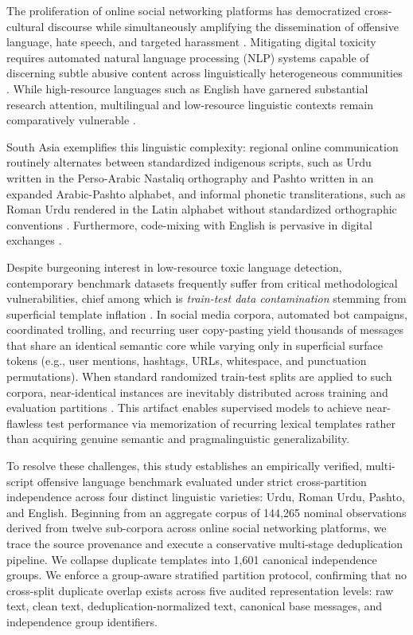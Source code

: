 \documentclass[11pt,a4paper]{article}
\begin{document}
The proliferation of online social networking platforms has democratized cross-cultural discourse while simultaneously amplifying the dissemination of offensive language, hate speech, and targeted harassment \cite{davidson2017automated,zampieri2019predicting}. Mitigating digital toxicity requires automated natural language processing (NLP) systems capable of discerning subtle abusive content across linguistically heterogeneous communities \cite{waseem2016hateful,founta2018large}. While high-resource languages such as English have garnered substantial research attention, multilingual and low-resource linguistic contexts remain comparatively vulnerable \cite{conneau2020unsupervised,rizwan2020hate}. 

South Asia exemplifies this linguistic complexity: regional online communication routinely alternates between standardized indigenous scripts, such as Urdu written in the Perso-Arabic Nastaliq orthography and Pashto written in an expanded Arabic-Pashto alphabet, and informal phonetic transliterations, such as Roman Urdu rendered in the Latin alphabet without standardized orthographic conventions \cite{shakeel2020deep,amjad2021urdu,khan2021pashto}. Furthermore, code-mixing with English is pervasive in digital exchanges \cite{akhter2020roman,bali2014borrowing}.

Despite burgeoning interest in low-resource toxic language detection, contemporary benchmark datasets frequently suffer from critical methodological vulnerabilities, chief among which is \textit{train-test data contamination} stemming from superficial template inflation \cite{elangovan2021memorization,gorman2019we}. In social media corpora, automated bot campaigns, coordinated trolling, and recurring user copy-pasting yield thousands of messages that share an identical semantic core while varying only in superficial surface tokens (e.g., user mentions, hashtags, URLs, whitespace, and punctuation permutations). When standard randomized train-test splits are applied to such corpora, near-identical instances are inevitably distributed across training and evaluation partitions \cite{arhin2021ground}. This artifact enables supervised models to achieve near-flawless test performance via memorization of recurring lexical templates rather than acquiring genuine semantic and pragmalinguistic generalizability.

To resolve these challenges, this study establishes an empirically verified, multi-script offensive language benchmark evaluated under strict cross-partition independence across four distinct linguistic varieties: Urdu, Roman Urdu, Pashto, and English. Beginning from an aggregate corpus of 144,265 nominal observations derived from twelve sub-corpora across online social networking platforms, we trace the source provenance and execute a conservative multi-stage deduplication pipeline. We collapse duplicate templates into 1,601 canonical independence groups. We enforce a group-aware stratified partition protocol, confirming that no cross-split duplicate overlap exists across five audited representation levels: raw text, clean text, deduplication-normalized text, canonical base messages, and independence group identifiers.
\end{document}
